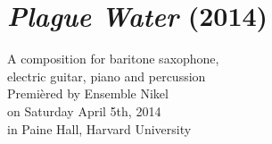 \chapter{\emph{Plague Water} (2014)}

\begin{singlespacing}
\begin{flushright}
A composition for baritone saxophone, \\
electric guitar, piano and percussion \\
\vspace*{\baselineskip}
Premi\`{e}red by Ensemble Nikel \\
on Saturday April 5th, 2014 \\
in Paine Hall, Harvard University
\end{flushright}
\end{singlespacing}

